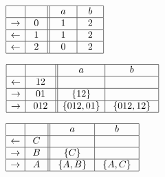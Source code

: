 \documentclass{llncs}
\newcommand{\fA}{{\mathfrak A}}
\newcommand{\fD}{{\mathfrak D}}
\newcommand{\rev}{\mathbb{R}}
\newcommand{\deter}{\mathbb{D}}
\newcommand{\trim}{\mathbb{T}}
\begin{document}
\begin{example}
\begin{table}[b]
\begin{minipage}[b]{0.25\linewidth}
\caption{$\fD$.}
\label{tab:dkw}
\begin{center}
$
\begin{array}{|c| c||c| c| }    
\hline
& \ \  \ \ 
&\ \ a \ \ &\ \ b \ \ \\
\hline  
\rightarrow & 0
& \ 1 \ & \ 2 \ \\
\hline  
\leftarrow& 1
&  1  & 2 \\
\hline  
\leftarrow & 2
 &  0 &  2  \\
\hline  
\end{array}
$
\end{center}
\end{minipage}
\hspace{0.05cm}
\begin{minipage}[b]{0.25\linewidth}
\caption{$\fD^{\rev\deter\rev\trim}$.}
\label{tab:drdrkw}
\begin{center}
$
\begin{array}{|c| c||c| c| }    
\hline
& \ \  \ \ 
&\ \ a \ \ &\ \ b \ \   \\
\hline  
\leftarrow & 12
& &  \\
\hline  
\rightarrow & 01
&  \{12\} &   \\
\hline  
\rightarrow & \ 012 \
&  \{012,01\}  & \ \{012,12\} \  \\
\hline  
\end{array}
$
\end{center}
\end{minipage}
\hspace{1.5cm}
\begin{minipage}[b]{0.25\linewidth}
\caption{$\fA^ \trim$.}
\label{tab:akw}
\begin{center}
$
\begin{array}{|c| c||c| c| }    
\hline
& \ \  \ \ 
&\ \ a \ \ &\ \ b \ \   \\
\hline  
\leftarrow & C
& &  \\
\hline  
\rightarrow & B
&  \{C\} &   \\
\hline  
\rightarrow & \ A \
& \ \{A,B\} \ & \ \{A,C\} \  \\
\hline  
\end{array}
$
\end{center}
\end{minipage}
\end{table}


\end{example}
\end{document}
